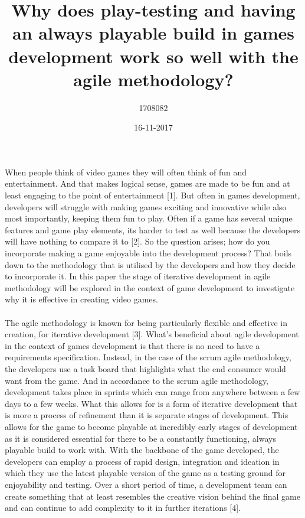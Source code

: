 \documentclass{article}
\title{Why does play-testing and having an always playable build in games development work so well with the agile methodology? }
\date{16-11-2017}
\author{1708082}
\begin{document}
\maketitle
\newpage
{}
 
When people think of video games they will often think of fun and entertainment. And that makes logical sense, games are made to be fun and at least engaging to the point of entertainment [1]. But often in games development, developers will struggle with making games exciting and innovative while also most importantly, keeping them fun to play. Often if a game has several unique features and game play elements, its harder to test as well because the developers will have nothing to compare it to [2]. So the question arises; how do you incorporate making a game enjoyable into the development process? That boils down to the methodology that is utilised by the developers and how they decide to incorporate it. In this paper the stage of iterative development in agile methodology will be explored in the context of game development to investigate why it is effective in creating video games.
\paragraph{}
The agile methodology is known for being particularly flexible and effective in creation, for iterative development [3]. What's beneficial about agile development in the context of games development is that there is no need to have a requirements specification. Instead, in the case of the scrum agile methodology, the developers use a task board that highlights what the end consumer would want from the game. And in accordance to the scrum agile methodology, development takes place in sprints which can range from anywhere between a few days to a few weeks. What this allows for is a form of iterative development that is more a process of refinement than it is separate stages of development. This allows for the game to become playable at incredibly early stages of development as it is considered essential for there to be a constantly functioning, always playable build to work with. With the backbone of the game developed, the developers can employ a process of rapid design, integration and ideation in which they use the latest playable version of the game as a testing ground for enjoyability and testing. Over a short period of time, a development team can create something that at least resembles the creative vision behind the final game and can continue to add complexity to it in further iterations [4].
\end{document}
